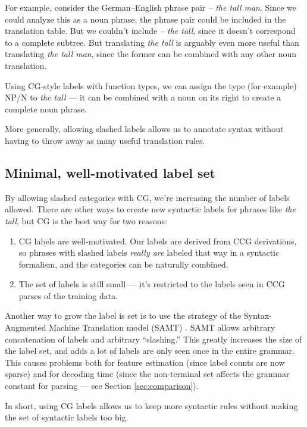 \documentclass[a4paper]{article}
\begin{document}
For example, consider the German--English phrase pair {\em  -- the tall man}. Since we could analyze this as a noun phrase, the phrase pair could be included in the translation table. But we couldn't include {\em -- the tall}, since it doesn't correspond to a complete subtree. But translating {\em the tall} is arguably even more useful than translating {\em the tall man}, since the former can be combined with any other noun translation.

Using CG-style labels with function types, we can assign the type (for example) NP/N to {\em the tall} --- it can be combined with a noun on its right to create a complete noun phrase.

More generally, allowing slashed labels allows us to annotate syntax without having to throw away as many useful translation rules.

\subsection{Minimal, well-motivated label set}

By allowing slashed categories with CG, we're increasing the number of labels allowed. There are other ways to create new syntactic labels for phrases like {\em the tall}, but CG is the best way for two reasons:
\begin{enumerate}
\item CG labels are well-motivated. Our labels are derived from CCG derivations, so phrases with slashed labels {\em really are} labeled that way in a syntactic formalism, and the categories can be naturally combined.
\item The set of labels is still small --- it's restricted to the labels seen in CCG parses of the training data.
\end{enumerate}

Another way to grow the label is set is to use the strategy of the Syntax-Augmented Machine Translation model (SAMT) \cite{samt-wmt06}. SAMT allows arbitrary concatenation of labels and arbitrary ``slashing.'' This greatly increases the size of the label set, and adds a lot of labels are only seen once in the entire grammar. This causes problems both for feature estimation (since label counts are now sparse) and for decoding time (since the non-terminal set affects the grammar constant for parsing --- see Section \ref{sec:comparison}).

In short, using CG labels allows us to keep more syntactic rules without making the set of syntactic labels too big.
\end{document}
